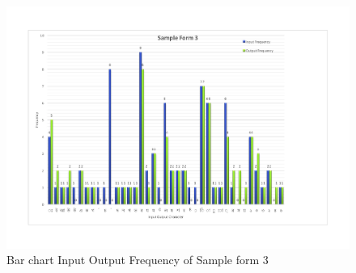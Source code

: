 \begin{figure}[H]
\centering
\includegraphics[width=1\textwidth]{Bform3.pdf}
\caption {Bar chart Input Output Frequency of Sample form 3}
\label {fig:Bbar3}
\end{figure}



